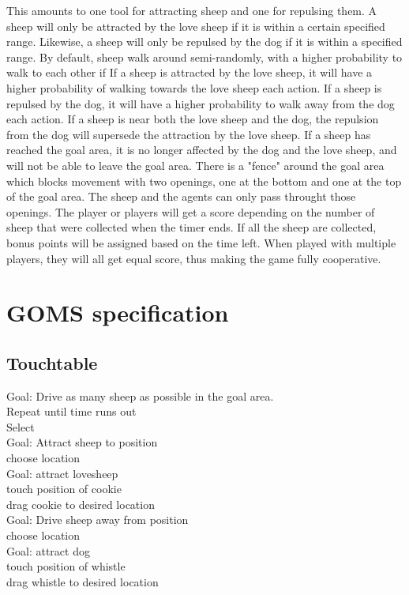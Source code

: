 \documentclass[a4paper,10pt]{report}
\newcommand{\tab}{\hspace*{1em}}
\begin{document}
This amounts to one tool for attracting sheep and one for repulsing them. 
A sheep will only be attracted by the love sheep if it is within a certain specified range.
Likewise, a sheep will only be repulsed by the dog if it is within a specified range.
By default, sheep walk around semi-randomly, with a higher probability to walk to each other if 
If a sheep is attracted by the love sheep, it will have a higher probability of walking towards the love sheep each action.
If a sheep is repulsed by the dog, it will have a higher probability to walk away from the dog each action.
If a sheep is near both the love sheep and the dog, the repulsion from the dog will supersede the attraction by the love sheep.
If a sheep has reached the goal area, it is no longer affected by the dog and the love sheep, and will not be able to leave the goal area.
There is a "fence" around the goal area which blocks movement with two openings, one at the bottom and one at the top of the goal area.
The sheep and the agents can only pass throught those openings. 
The player or players will get a score depending on the number of sheep that were collected when the timer ends.
If all the sheep are collected, bonus points will be assigned based on the time left.
When played with multiple players, they will all get equal score, thus making the game fully cooperative.

\section{GOMS specification}

\subsection{Touchtable}
Goal: Drive as many sheep as possible in the goal area.
\\
\tab Repeat until time runs out \\
\tab \tab Select \\
\tab  \tab \tab Goal: Attract sheep to position\\
\tab \tab \tab \tab choose location \\
\tab \tab \tab \tab Goal: attract lovesheep \\
\tab \tab \tab \tab \tab touch position of cookie \\
\tab \tab \tab \tab \tab drag cookie to desired location \\
\tab \tab \tab Goal: Drive sheep away from position\\
\tab \tab \tab \tab choose location \\
\tab \tab \tab \tab Goal: attract dog \\
\tab \tab \tab \tab \tab touch position of whistle \\
\tab \tab \tab \tab \tab drag whistle to desired location\\
\end{document}

